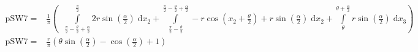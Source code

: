 \begin{align}
    \mathrm{pSW7} =&\frac{1}{\pi} \left(\;\;\int\limits_{\frac{\pi}{2} - \frac{\theta}{2} + \frac{\alpha}{2}}^{\frac{\pi}{2}}2 r \sin{\left (\frac{\alpha}{2} \right )}\;\mathrm{d}x_{2}+\int\limits_{\frac{\pi}{2} - \frac{\theta}{2}}^{\frac{\pi}{2} - \frac{\theta}{2} + \frac{\alpha}{2}}- r \cos{\left (x_{2} + \frac{\theta}{2} \right )} + r \sin{\left (\frac{\alpha}{2} \right )}\;\mathrm{d}x_{2}+\int\limits_{\theta}^{\theta + \frac{\alpha}{2}}r \sin{\left (\frac{\alpha}{2} \right )}\;\mathrm{d}x_{3}\right)\label{pSW7Def}\\
    \mathrm{pSW7} =& \frac{r}{\pi} \left(\theta \sin{\left (\frac{\alpha}{2} \right )} - \cos{\left (\frac{\alpha}{2} \right )} + 1\right)\label{pSW7Sln}
\end{align}